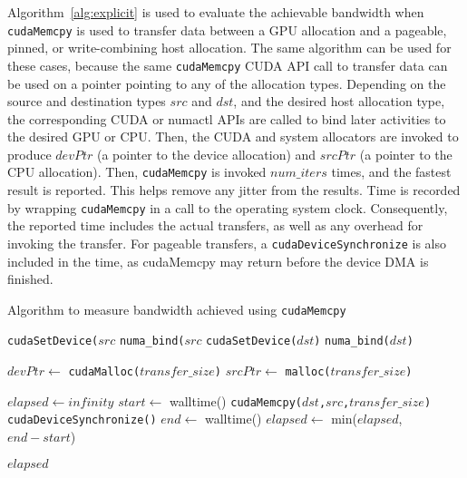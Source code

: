 Algorithm~\ref{alg:explicit} is used to evaluate the achievable bandwidth when \texttt{cudaMemcpy} is used to transfer data between a GPU allocation and a pageable, pinned, or write-combining host allocation. 
The same algorithm can be used for these cases, because the same \texttt{cudaMemcpy} CUDA API call to transfer data can be used on a pointer pointing to any of the allocation types.
Depending on the source and destination types $src$ and $dst$, and the desired host allocation type, the corresponding CUDA or numactl APIs are called to bind later activities to the desired GPU or CPU.
Then, the CUDA and system allocators are invoked to produce $devPtr$ (a pointer to the device allocation) and $srcPtr$ (a pointer to the CPU allocation).
Then, \texttt{cudaMemcpy} is invoked $num\_iters$ times, and the fastest result is reported.
This helps remove any jitter from the results.
Time is recorded by wrapping \texttt{cudaMemcpy} in a call to the operating system clock.
Consequently, the reported time includes the actual transfers, as well as any overhead for invoking the transfer.
For pageable transfers, a \texttt{cudaDeviceSynchronize} is also included in the time, as cudaMemcpy may return before the device DMA is finished.


\begin{algorithm}
    \caption{Algorithm to measure bandwidth achieved using \texttt{cudaMemcpy}}
    \label{alg:explicit}
    \begin{algorithmic}[1]
    \Statex
            \State \texttt{cudaSetDevice($src$}
        \Else {}
            \State \texttt{numa\_bind($src$}
        \EndIf
        \State \texttt{cudaSetDevice($dst$)}
        \Else {}
        \State \texttt{numa\_bind($dst$)}
        \EndIf

        \State $devPtr \gets$ \texttt{cudaMalloc($transfer\_size$)} 
        \State $srcPtr \gets$ \texttt{malloc($transfer\_size$)} 

        \State $elapsed \gets infinity$ 
            \State $start \gets$ walltime()
            \State \texttt{cudaMemcpy($dst$,$src$,$transfer\_size$)}
            \State \texttt{cudaDeviceSynchronize()}
            \State $end \gets$ walltime()
            \State $elapsed \gets$ min($elapsed$, $end-start$)
        \EndFor

        \Return $elapsed$
    \EndFunction

    \end{algorithmic}
\end{algorithm}

